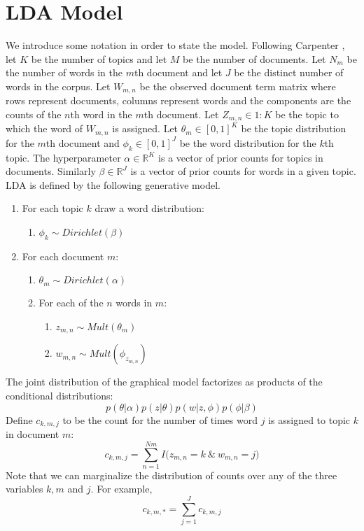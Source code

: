 \documentclass{article}%
\theoremstyle{definition}
\begin{document}
\section{LDA Model}
\label{sec:ldamodel}
We introduce some notation in order to state the model. Following Carpenter \cite{Carpenter10integrating}, let $K$ be the number of topics and let $M$ be the number of documents. Let $N_m$ be the number of words in the $m$th document and let $J$ be the distinct number of words in the corpus. Let  $W_{m,n}$ be the observed document term matrix where rows represent documents, columns represent words and the components are the counts of the $n$th word in the $m$th document. Let $Z_{m,n} \in 1:K$ be the topic to which the word of $W_{m,n}$ is assigned. Let $\theta_m \in [0, 1]^K$ be the topic distribution for the $m$th document and $\phi_k \in [0, 1]^J$ be the word distribution for the $k$th topic. The hyperparameter $\alpha \in \mathbb{R}^K$ is a vector of prior counts for topics in documents. Similarly $\beta \in \mathbb{R}^J$ is a vector of prior counts for words in a given topic.
LDA is defined by the following generative model.
\begin{enumerate}
    \item For each topic $k$ draw a word distribution: 
    \begin{enumerate}
        \item $\phi_k \sim Dirichlet(\beta)$
    \end{enumerate}
    \item For each document $m$: 
        \begin{enumerate}
        \item $\theta_m \sim Dirichlet(\alpha)$
        \item For each of the $n$ words in $m$:
        \begin{enumerate}
            \item $z_{m,n} \sim Mult(\theta_m) $
            \item $w_{m,n} \sim Mult(\phi_{z_{m,n}}) $ 
        \end{enumerate}
        \end{enumerate}
\end{enumerate}
The joint distribution of the graphical model factorizes as products of the conditional distributions:
\begin{equation}
    p(\theta | \alpha)p(z|\theta) p(w|z, \phi)p(\phi | \beta)
\end{equation}
Define $c_{k,m,j}$ to be the count for the number of times word $j$ is assigned to topic $k$ in document $m$:
\[ c_{k,m,j} = \sum\limits_{n=1}^{Nm}I\Big(z_{m,n} = k \ \& \ w_{m,n} = j \Big) \]
Note that we can marginalize the distribution of counts over any of the three variables $k, m$ and $j$. For example,
\[ c_{k,m,*} = \sum\limits_{j=1}^{J}c_{k,m,j} \]
\end{document}
